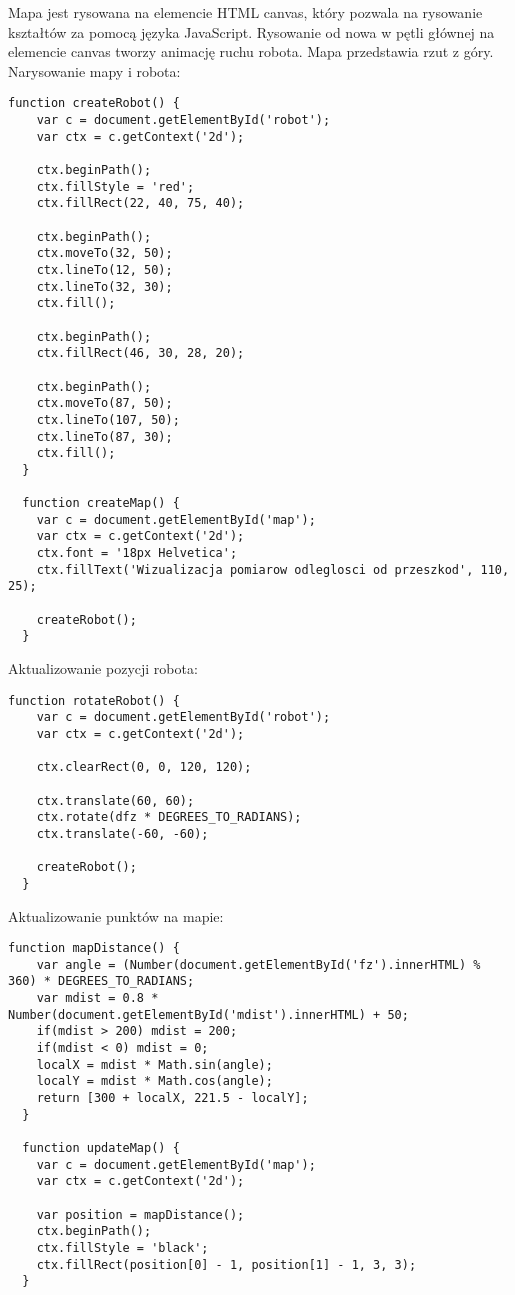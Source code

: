 \documentclass[a4paper,12pt,twoside,openany]{report}
\begin{document}
Mapa jest rysowana na elemencie HTML canvas, który pozwala na rysowanie kształtów za pomocą języka JavaScript. Rysowanie od nowa w pętli głównej na elemencie canvas tworzy animację ruchu robota. Mapa przedstawia rzut z góry. Narysowanie mapy i robota:
\begin{lstlisting}[style=customhtml]
  function createRobot() {
	var c = document.getElementById('robot');
	var ctx = c.getContext('2d');
	
	ctx.beginPath();
	ctx.fillStyle = 'red';
	ctx.fillRect(22, 40, 75, 40);
	
	ctx.beginPath();
	ctx.moveTo(32, 50);
	ctx.lineTo(12, 50);
	ctx.lineTo(32, 30);
	ctx.fill();
	
	ctx.beginPath();
	ctx.fillRect(46, 30, 28, 20);
	
	ctx.beginPath();
	ctx.moveTo(87, 50);
	ctx.lineTo(107, 50);
	ctx.lineTo(87, 30);
	ctx.fill();
  }

  function createMap() {
	var c = document.getElementById('map');
	var ctx = c.getContext('2d');
	ctx.font = '18px Helvetica';
	ctx.fillText('Wizualizacja pomiarow odleglosci od przeszkod', 110, 25);
	
	createRobot();
  }
\end{lstlisting}
Aktualizowanie pozycji robota:
\begin{lstlisting}[style=customhtml]
  function rotateRobot() {
	var c = document.getElementById('robot');
	var ctx = c.getContext('2d');
	
	ctx.clearRect(0, 0, 120, 120);
	
	ctx.translate(60, 60);
	ctx.rotate(dfz * DEGREES_TO_RADIANS);
	ctx.translate(-60, -60);
	
	createRobot();
  }
\end{lstlisting}
Aktualizowanie punktów na mapie:
\begin{lstlisting}[style=customhtml]
  function mapDistance() {
	var angle = (Number(document.getElementById('fz').innerHTML) % 360) * DEGREES_TO_RADIANS;
	var mdist = 0.8 * Number(document.getElementById('mdist').innerHTML) + 50;
	if(mdist > 200) mdist = 200;
	if(mdist < 0) mdist = 0;
	localX = mdist * Math.sin(angle);
	localY = mdist * Math.cos(angle);
	return [300 + localX, 221.5 - localY];
  }

  function updateMap() {
	var c = document.getElementById('map');
	var ctx = c.getContext('2d');
	
	var position = mapDistance();
	ctx.beginPath();
	ctx.fillStyle = 'black';
	ctx.fillRect(position[0] - 1, position[1] - 1, 3, 3);
  }
\end{lstlisting}
\end{document}
